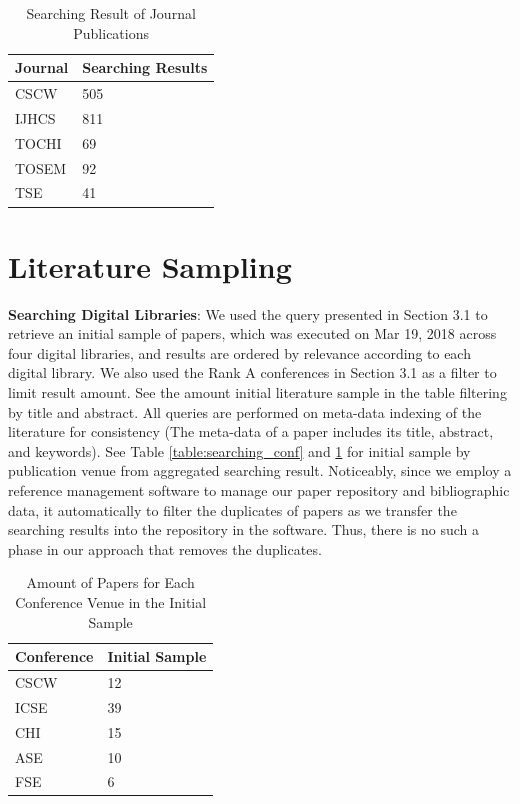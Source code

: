 \begin{table}[tbp]
\centering
\begin{tabular}{ll}
\hline
\textbf{Journal} & \textbf{Searching Results} \\ \hline
CSCW    & 505               \\
IJHCS   & 811               \\ 
TOCHI   & 69                \\
TOSEM   & 92                \\
TSE     & 41                \\ \hline
\end{tabular}
\caption{Searching Result of Journal Publications}
\label{table:searching_jour}
\end{table}

\section{Literature Sampling}

\textbf{Searching Digital Libraries}: We used the query presented in Section 3.1 to retrieve an initial sample of papers, which was executed on Mar 19, 2018 across four digital libraries, and results are ordered by relevance according to each digital library.  We also used the Rank A conferences in Section 3.1 as a filter to limit result amount. See the amount initial literature sample in the table filtering by title and abstract. All queries are performed on meta-data indexing of the literature for consistency (The meta-data of a paper includes its title, abstract, and keywords).  See Table \ref{table:searching_conf} and \ref{table:searching_jour} for initial sample by publication venue from aggregated searching result. Noticeably, since we employ a reference management software to manage our paper repository and bibliographic data, it automatically to filter the duplicates of papers as we transfer the searching results into the repository in the software. Thus, there is no such a phase in our approach that removes the duplicates.

\begin{table}[tbp]
\centering
\begin{tabular}{ll}
\hline
\textbf{Conference} & \textbf{Initial Sample} \\ \hline
CSCW       & 12             \\ 
ICSE       & 39             \\ 
CHI        & 15             \\ 
ASE        & 10             \\ 
FSE        & 6              \\ \hline
\end{tabular}
\caption{Amount of Papers for Each Conference Venue in the Initial Sample}
\label{table:sample1_conf}
\end{table}

